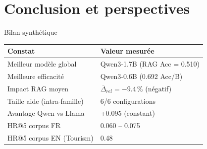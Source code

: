 \documentclass[aspectratio=169, 12pt]{beamer}
\begin{document}
\section{Conclusion et perspectives}

\begin{frame}{Bilan synth\'etique}
  \begin{table}
    \centering
    \small
    \begin{tabular}{@{} l l @{}}
      \toprule
      \textbf{Constat} & \textbf{Valeur mesur\'ee} \\
      \midrule
      Meilleur mod\`ele global & Qwen3-1.7B (RAG Acc = 0.510) \\
      Meilleure efficacit\'e & Qwen3-0.6B (0.692 Acc/B) \\
      Impact RAG moyen & $\bar{\Delta}_{rel} = -9.4\,\%$ (n\'egatif) \\
      Taille aide (intra-famille) & 6/6 configurations \\
      Avantage Qwen vs Llama & +0.095 (constant) \\
      HR@5 corpus FR & 0.060 -- 0.075 \\
      HR@5 corpus EN (Tourism) & 0.48 \\
      \bottomrule
    \end{tabular}
  \end{table}
\end{frame}
\end{document}
